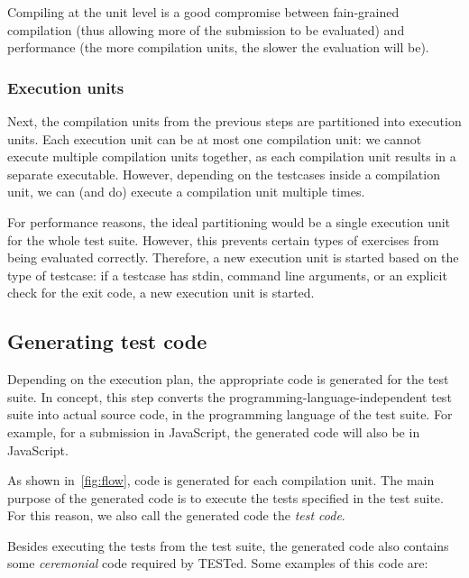 \documentclass[../main]{subfiles}
\begin{document}
Compiling at the unit level is a good compromise between fain-grained compilation (thus allowing more of the submission to be evaluated) and performance (the more compilation units, the slower the evaluation will be).

\subsubsection{Execution units}

Next, the compilation units from the previous steps are partitioned into execution units.
Each execution unit can be at most one compilation unit: we cannot execute multiple compilation units together,
as each compilation unit results in a separate executable.
However, depending on the testcases inside a compilation unit, we can (and do) execute a compilation unit multiple times.

For performance reasons, the ideal partitioning would be a single execution unit for the whole test suite.
However, this prevents certain types of exercises from being evaluated correctly.
Therefore, a new execution unit is started based on the type of testcase: if a testcase has stdin, command line arguments, or an explicit check for the exit code, a new execution unit is started.

\subsection{Generating test code}\label{subsec:code-generation}

Depending on the execution plan, the appropriate code is generated for the test suite.
In concept, this step converts the programming-language-independent test suite into actual source code, in the programming language of the test suite.
For example, for a submission in JavaScript, the generated code will also be in JavaScript.

As shown in~\cref{fig:flow}, code is generated for each compilation unit.
The main purpose of the generated code is to execute the tests specified in the test suite.
For this reason, we also call the generated code the \emph{test code}.

Besides executing the tests from the test suite, the generated code also contains some \emph{ceremonial} code required by TESTed.
Some examples of this code are:
\end{document}
